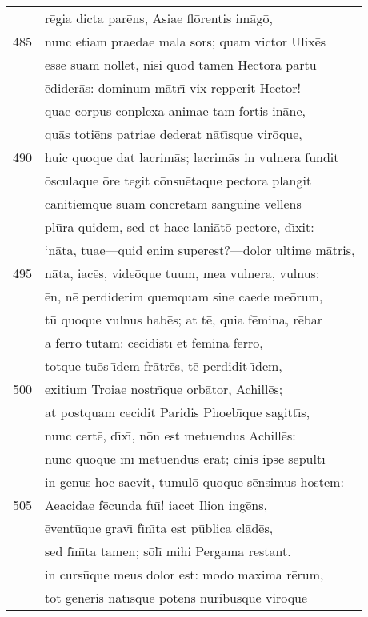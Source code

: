 \documentclass[paper=6in:9in,pagesize=pdftex,
               headinclude=on,footinclude=on,12pt]{scrbook}
\begin{document}
\begin{longtable}[p]{ r l }
 & r\=egia dicta par\=ens, Asiae fl\=orentis im\=ag\=o,\\ 
485 & nunc etiam praedae mala sors; quam victor Ulix\=es\\ 
 & esse suam n\=ollet, nisi quod tamen Hectora part\=u\\ 
 & \=edider\=as: dominum m\=atr\={\i} vix repperit Hector!\\ 
 & quae corpus conplexa animae tam fortis in\=ane,\\ 
 & qu\=as toti\=ens patriae dederat n\=at\={\i}sque vir\=oque,\\ 
490 & huic quoque dat lacrim\=as; lacrim\=as in vulnera fundit\\ 
 & \=osculaque \=ore tegit c\=onsu\=etaque pectora plangit\\ 
 & c\=anitiemque suam concr\=etam sanguine vell\=ens\\ 
 & pl\=ura quidem, sed et haec lani\=at\=o pectore, d\={\i}xit:\\ 
 & `n\=ata, tuae—quid enim superest?—dolor ultime m\=atris,\\ 
495 & n\=ata, iac\=es, vide\=oque tuum, mea vulnera, vulnus:\\ 
 & \=en, n\=e perdiderim quemquam sine caede me\=orum,\\ 
 & t\=u quoque vulnus hab\=es; at t\=e, quia f\=emina, r\=ebar\\ 
 & \=a ferr\=o t\=utam: cecidist\={\i} et f\=emina ferr\=o,\\ 
 & totque tu\=os \={\i}dem fr\=atr\=es, t\=e perdidit \={\i}dem,\\ 
500 & exitium Troiae nostr\={\i}que orb\=ator, Achill\=es;\\ 
 & at postquam cecidit Paridis Phoeb\={\i}que sagitt\={\i}s,\\ 
 & nunc cert\=e, d\={\i}x\={\i}, n\=on est metuendus Achill\=es:\\ 
 & nunc quoque m\={\i} metuendus erat; cinis ipse sepult\={\i}\\ 
 & in genus hoc saevit, tumul\=o quoque s\=ensimus hostem:\\ 
505 & Aeacidae f\=ecunda fu\={\i}! iacet \=Ilion ing\=ens,\\ 
 & \=event\=uque grav\={\i} f\={\i}n\={\i}ta est p\=ublica cl\=ad\=es,\\ 
 & sed f\={\i}n\={\i}ta tamen; s\=ol\={\i} mihi Pergama restant.\\ 
 & in curs\=uque meus dolor est: modo maxima r\=erum,\\ 
 & tot generis n\=at\={\i}sque pot\=ens nuribusque vir\=oque\\ 

\end{longtable}
\end{document}
